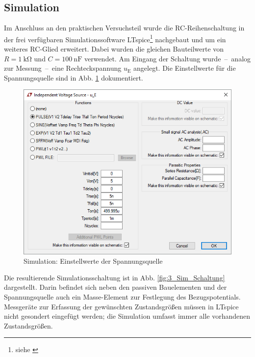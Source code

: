 \subsection{Simulation}
\label{subsec:3_Simulation}
%
Im Anschluss an den praktischen Versuchsteil wurde die RC-Reihenschaltung in der frei verfügbaren Simulationssoftware LTspice\footnote{siehe \cite{src:LTspice}} nachgebaut und um ein weiteres RC-Glied erweitert. Dabei wurden die gleichen Bauteilwerte von $R = \SI{1}{\kilo\ohm}$ und $C = \SI{100}{\nano\farad}$ verwendet. Am Eingang der Schaltung wurde~--~analog zur Messung~--~eine Rechteckspannung $u_\mathrm{E}$ angelegt. Die Einstellwerte für die Spannungsquelle sind in Abb. \ref{fig:3_Sim_Spannungsquelle} dokumentiert.
%
\begin{figure}[H]
  \centering
  \includegraphics[width=0.9\linewidth]{src/3_Sim_Spannungsquelle.png}
  \caption{Simulation: Einstellwerte der Spannungsquelle}
  \label{fig:3_Sim_Spannungsquelle}
\end{figure}
%
Die resultierende Simulationsschaltung ist in Abb. \ref{fig:3_Sim_Schaltung} dargestellt. Darin befindet sich neben den passiven Bauelementen und der Spannungsquelle auch ein Masse-Element zur Festlegung des Bezugspotentials. Messgeräte zur Erfassung der gewünschten Zustandsgrößen müssen in LTspice nicht gesondert eingefügt werden; die Simulation umfasst immer alle vorhandenen Zustandsgrößen.
%
